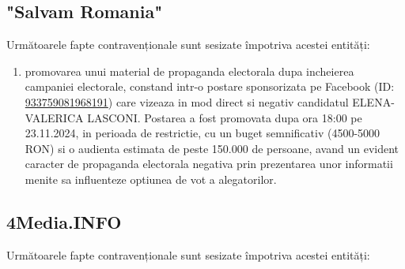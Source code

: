 \documentclass[a4paper,12pt]{article}
\begin{document}
\vspace{0.5cm}

\subsection{"Salvam Romania"}
Următoarele fapte contravenționale sunt sesizate împotriva acestei entități:

\begin{enumerate}[leftmargin=*, label=\arabic*.)]
    \item promovarea unui material de propaganda electorala dupa incheierea campaniei electorale, constand intr-o postare sponsorizata pe Facebook (ID: \href{https://www.facebook.com/ads/library/?id=933759081968191}{933759081968191}) care vizeaza in mod direct si negativ candidatul ELENA-VALERICA LASCONI. Postarea a fost promovata dupa ora 18:00 pe 23.11.2024, in perioada de restrictie, cu un buget semnificativ (4500-5000 RON) si o audienta estimata de peste 150.000 de persoane, avand un evident caracter de propaganda electorala negativa prin prezentarea unor informatii menite sa influenteze optiunea de vot a alegatorilor.
\end{enumerate}

\vspace{0.5cm}

\subsection{4Media.INFO}
Următoarele fapte contravenționale sunt sesizate împotriva acestei entități:
\end{document}
